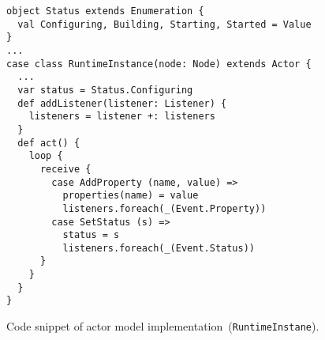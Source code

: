\begin{figure}[tb]
  \begin{center}
    \begin{verbatim}
object Status extends Enumeration {
  val Configuring, Building, Starting, Started = Value
}
...
case class RuntimeInstance(node: Node) extends Actor {
  ...
  var status = Status.Configuring
  def addListener(listener: Listener) {
    listeners = listener +: listeners
  }
  def act() {
    loop {
      receive {
        case AddProperty (name, value) => 
          properties(name) = value
          listeners.foreach(_(Event.Property))
        case SetStatus (s) =>
          status = s
          listeners.foreach(_(Event.Status))
      }
    }
  }
}
    \end{verbatim}
  \end{center}
  \caption{Code snippet of actor model implementation~(\texttt{RuntimeInstane}).}
  \label{list:runtimeinstance}
\end{figure}

